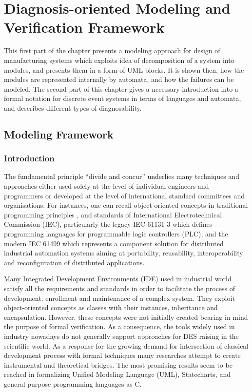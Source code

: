 

\ifx {} \undefined
	\newtheorem{definition}{Definition}
\fi
\ifx \conjecture \undefined
	\newtheorem{conjecture}{Conjecture}
\fi

\chapter{Diagnosis-oriented Modeling and Verification Framework}
\label{chap:framework}

This first part of the chapter presents a modeling approach for design of
manufacturing systems which exploits idea of decomposition of a system into modules, and presents them
in a form of UML blocks. It is shown then, how the modules are
represented internally by automata, and how the failures can be modeled. The
second part of this chapter gives a necessary introduction into a formal
notation for discrete event systems in terms of languages and automata,
and describes different types of diagnosability.

\section{Modeling Framework}

\subsection{Introduction}

The fundamental principle ``divide and concur'' underlies many techniques and
approaches either used solely at the level of individual engineers and
programmers or developed at the level of international standard committees and
organisations. For instances, one can recall object-oriented concepts in
traditional programming principles \cite{farrell_object-oriented_2013}, and
standards of International Electrotechnical Commission (IEC),
particularly the legacy IEC 61131-3 \cite{otto_iec_2009} which defines
programming languages for programmable logic controllers (PLC), and the modern
IEC 61499 \cite{vyatkin_iec_2009} which represents a component solution for
distributed industrial automation systems aiming at portability, reusability,
interoperability and reconfiguration of distributed applications.

Many Integrated Development Environments (IDE) used in industrial world satisfy
all the requirements and standards in order to facilitate the process of
development, enrollment and maintenance of a complex system. They
exploit object-oriented concepts as classes with their instances, inheritance
and encapsulation. However, these concepts were not initially created bearing in
mind the purpose of formal verification. As a consequence, the tools widely used
in industry nowadays do not generally support approaches for DES raising in the
scientific world. As a response for the growing demand for intersection of
classical development process with formal techniques many researches
attempt to create instrumental and theoretical bridges. The most
promising results seem to be reached in formalizing Unified Modeling Language
(UML), Statecharts, and general purpose programming languages as C. 

